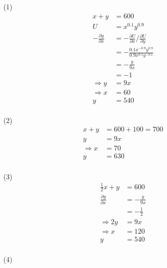 \documentclass{article}
\begin{document}
\begin{enumerate}
\begin{enumerate}
        \item[(1)] \begin{equation}
            \begin{aligned}
                x+y&=600 \\
                U
                &=x^{0.1}y^{0.9}\\
                -\frac{\partial y}{\partial x}
                &=-\frac{\partial U}{\partial x}/\frac{\partial U}{\partial y} \\
                &=-\frac{0.1x^{-0.9}y^{0.9}}{0.9x^{0.1}y^{-0.1}} \\
                &=-\frac{y}{9x} \\
                &=-1 \\
                \Rightarrow y&=9x \\
                \Rightarrow x&=60 \\
                y&=540 \\
            \end{aligned} \nonumber
        \end{equation}
        \item[(2)] \begin{equation}
            \begin{aligned}
                x+y&=600+100=700 \\
                y&=9x \\
                \Rightarrow x&=70 \\
                y&=630 \\
            \end{aligned} \nonumber
        \end{equation}
        \item[(3)] \begin{equation}
            \begin{aligned}
                \frac{1}{2}x+y&=600 \\
                \frac{\partial y}{\partial x}
                &=-\frac{y}{9x} \\
                &=-\frac{1}{2} \\
                \Rightarrow 2y&=9x \\
                \Rightarrow x&=120 \\
                y&=540 \\
            \end{aligned} \nonumber
        \end{equation}
        \item[(4)] \begin{equation}

\end{equation}
\end{enumerate}
\end{enumerate}
\end{document}
